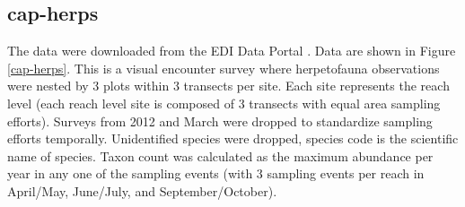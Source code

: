 \documentclass[11pt, oneside]{article}
\begin{document}
\subsection {cap-herps}
The data were downloaded from the EDI Data Portal \citep{cap-herps}.
Data are shown in Figure \ref{cap-herps}.
This is a visual encounter survey where herpetofauna observations were nested by 3 plots within 3 transects per site. 
Each site represents the reach level (each reach level site is composed of 3 transects with equal area sampling efforts). 
Surveys from 2012 and March were dropped to standardize sampling efforts temporally. 
Unidentified species were dropped, species code is the scientific name of species. 
Taxon count was calculated as the maximum abundance per year in any one of the sampling events (with 3 sampling events per reach in April/May, June/July, and September/October). 
\end{document}
